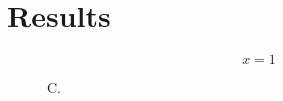 \documentclass{article}
\begin{document}
\section{Results}\label{sec:r}
\begin{equation} x = 1 \label{eq:unused} \end{equation}
\begin{figure}\caption{C.}\label{fig:unused}\end{figure}
\end{document}
